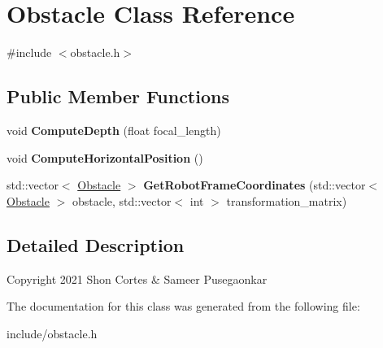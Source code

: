 \hypertarget{classObstacle}{}\section{Obstacle Class Reference}
\label{classObstacle}


{\ttfamily \#include $<$obstacle.\+h$>$}

\subsection*{Public Member Functions}
\begin{DoxyCompactItemize}
\item 
\mbox{\label{classObstacle_a635d683a5222330de501db98335fe7ac}} 
void {\bfseries Compute\+Depth} (float focal\+\_\+length)
\item 
\mbox{\label{classObstacle_a662a1c729b7d33d0c71458c24f0bb0ac}} 
void {\bfseries Compute\+Horizontal\+Position} ()
\item 
\mbox{\label{classObstacle_ada5a9b9174a6e67a0245dba89cf87683}} 
std\+::vector$<$ \hyperlink{classObstacle}{Obstacle} $>$ {\bfseries Get\+Robot\+Frame\+Coordinates} (std\+::vector$<$ \hyperlink{classObstacle}{Obstacle} $>$ obstacle, std\+::vector$<$ int $>$ transformation\+\_\+matrix)
\end{DoxyCompactItemize}


\subsection{Detailed Description}
Copyright 2021  Shon Cortes \& Sameer Pusegaonkar 

The documentation for this class was generated from the following file\+:\begin{DoxyCompactItemize}
\item 
include/obstacle.\+h\end{DoxyCompactItemize}
